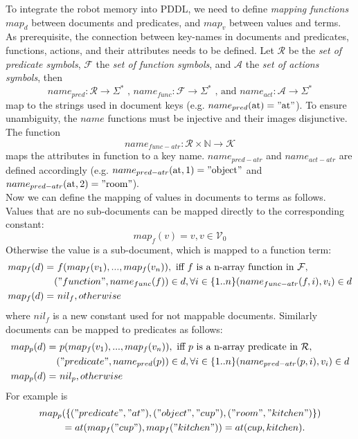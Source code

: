 To integrate the robot memory into PDDL, we need to define 
\emph{mapping functions} $map_d$ between documents and predicates, and
$map_v$ between values and terms. As prerequisite, the connection
between key-names in documents and predicates, functions, actions, and their
attributes needs to be defined. Let $\mathcal{R}$ be the \emph{set
  of predicate symbols}, $\mathcal{F}$ the \emph{set of function
  symbols}, and $\mathcal{A}$ the \emph{set of actions
  symbols}, then
%
$$name_{pred}: \mathcal{R} \rightarrow \Sigma^*
\text{ , } name_{func}: \mathcal{F} \rightarrow \Sigma^*
\text{ , and } name_{act}: \mathcal{A} \rightarrow \Sigma^*$$
%
map to the strings used in document keys
(e.g. $name_{pred}(\text{at})="\text{at}"$). To ensure unambiguity,
the $name$ functions must
be injective and their images disjunctive. The function
%
$$ name_{func-atr}: \mathcal{R} \times \mathbb{N} \rightarrow
\mathcal{K}$$
%
maps the attributes in function to a key name. $name_{pred-atr}$ and
$name_{act-atr}$ are defined accordingly
(e.g. $name_{pred-atr}(\text{at},1)="\text{object}"$ and
$name_{pred-atr}(\text{at},2)="\text{room}"$).
\\
Now we can define the mapping of values in documents to terms as
follows. Values that are no sub-documents can be mapped directly to
the corresponding constant:
$$map_f(v)=v, v \in \mathcal{V}_0$$
Otherwise the value is a sub-document, which is mapped to a function term:
\begin{align*}
  map_f(d)= &\text{ }f(map_f(v_1), ..., map_f(v_n)), \text{ iff } f \text{ is a n-array function in } \mathcal{F},\\
  &("function", name_{func}(f))\in d,
  \forall i \in \{1..n\} (name_{func-atr}(f,i), v_i)\in d\\
  map_f(d)= &\text{ } nil_f, otherwise\text{~~~~~~~~~~~~~~~}
\end{align*}
where $nil_f$ is a new constant used for not mappable documents.
Similarly documents can be mapped to predicates as follows:
\begin{align*}
  map_p(d)=&\text{ }p(map_f(v_1), ..., map_f(v_n)), \text{ iff } p \text{ is a n-array predicate in } \mathcal{R},\\
  &("predicate", name_{pred}(p))\in d,
  \forall i \in \{1..n\} (name_{pred-atr}(p,i), v_i)\in d\\
  map_p(d)=& \text{ }nil_p, otherwise\text{~~~~~~~~~~~~~~~}
\end{align*}
For example is
\begin{align*}
map_p&(\{("predicate", "at"),("object", "cup"),("room",
"kitchen")\})\\
&= at(map_f("cup"), map_f("kitchen")) = at(cup, kitchen) \text{.}
\end{align*}
